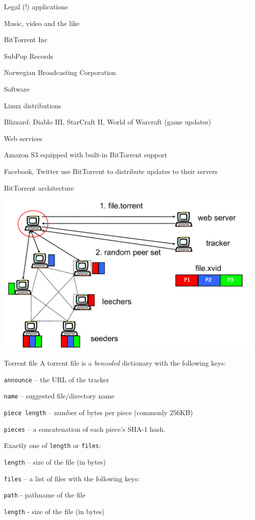 \begin{frame}{Legal (!) applications}
	
\BIL
\item Music, video and the like
	\BI
	\item BitTorrent Inc
	\item SubPop Records
	\item Norwegian Broadcasting Corporation
	\EI
\item Software
	\BI
	\item Linux distributions
	\item Blizzard: Diablo III, StarCraft II, World of Warcraft (game updates)
	\EI
\item Web services
\BI
\item Amazon S3 equipped with built-in BitTorrent support
\item Facebook, Twitter use BitTorrent to distribute updates to their servers
\EI
\EIL
\end{frame}

\begin{frame}{BitTorrent architecture}
	
\includegraphics[width=\textwidth]{bt-arch}	
	
\end{frame}






\begin{frame}{Torrent file}
A torrent file is a \textit{bencoded} dictionary with the following keys:
\BI
\item \texttt{announce} -- the URL of the tracker
\item \texttt{name} -- suggested file/directory name
\item \texttt{piece length} -- number of bytes per piece (commonly $256$KB)
\item \texttt{pieces} -- a concatenation of each piece's SHA-1 hash. 
\item Exactly one of \texttt{length} or \texttt{files}:
	\BI
	\item \texttt{length} -- size of the file (in bytes)
	\item \texttt{files} -- a list of files with the following keys:
		\BI
		\item \texttt{path} - pathname of the file
		\item \texttt{length} - size of the file (in bytes)
		\EI
	\EI
\EI
\end{frame}

